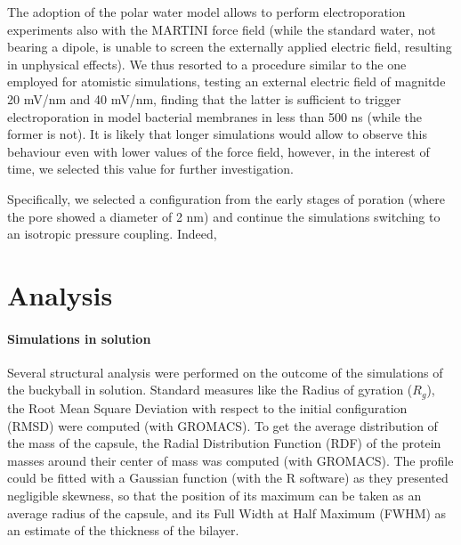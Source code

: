 The adoption of the polar water model allows to perform electroporation experiments also with the MARTINI force field (while the standard water, not bearing a dipole, is unable to screen the externally applied electric field, resulting in unphysical effects).
%
We thus resorted to a procedure similar to the one employed for atomistic simulations, testing an external electric field of magnitde 20 mV/nm and 40 mV/nm, finding that the latter is sufficient to trigger electroporation in model bacterial membranes in less than 500 ns (while the former is not). It is likely that longer simulations would allow to observe this behaviour even with lower values of the force field, however, in the interest of time, we selected this value for further investigation.

Specifically, we selected a configuration from the early stages of poration (where the pore showed a diameter of 2 nm) and continue the simulations switching to an isotropic pressure coupling. Indeed, 




\section{Analysis}

\paragraph{Simulations in solution}
Several structural analysis were performed on the outcome of the simulations of the buckyball in solution. Standard measures like the Radius of gyration ($R_g$), the Root Mean Square Deviation with respect to the initial configuration (RMSD) were computed (with GROMACS).
%
To get the average distribution of the mass of the capsule, the Radial Distribution Function (RDF) of the protein masses around their center of mass was computed (with GROMACS). The profile could be fitted with a Gaussian function (with the R \cite{??} software) as they presented negligible skewness, so that the position of its maximum can be taken as an average radius of the capsule, and its Full Width at Half Maximum (FWHM) as an estimate of the thickness of the bilayer.

